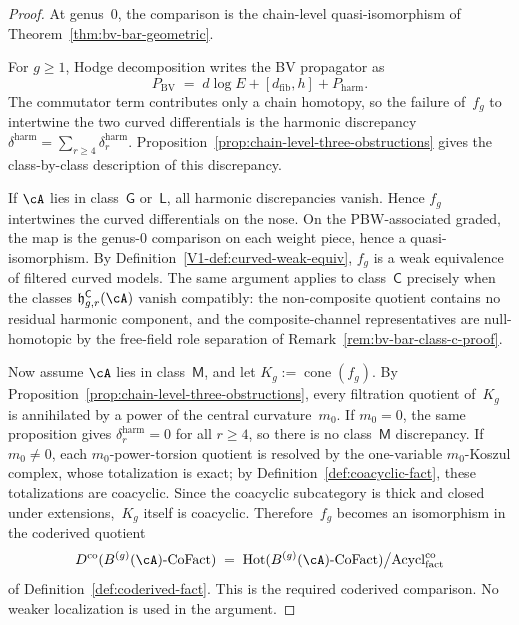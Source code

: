 \begin{proof}
At genus~$0$, the comparison is the chain-level quasi-isomorphism
of Theorem~\ref{thm:bv-bar-geometric}.

For $g \geq 1$, Hodge decomposition writes the BV propagator as
\[
P_{\mathrm{BV}}
\;=\;
d\log E + [d_{\mathrm{fib}}, h] + P_{\mathrm{harm}}.
\]
The commutator term contributes only a chain homotopy, so the
failure of~$f_g$ to intertwine the two curved differentials is the
harmonic discrepancy
$\delta^{\mathrm{harm}} = \sum_{r \geq 4}\delta_r^{\mathrm{harm}}$.
Proposition~\ref{prop:chain-level-three-obstructions} gives the
class-by-class description of this discrepancy.

If $\cA$ lies in class~$\mathsf{G}$ or~$\mathsf{L}$, all harmonic
discrepancies vanish. Hence $f_g$ intertwines the curved
differentials on the nose. On the PBW-associated graded, the map is
the genus-$0$ comparison on each weight piece, hence a
quasi-isomorphism. By Definition~\ref{V1-def:curved-weak-equiv}, $f_g$
is a weak equivalence of filtered curved models. The same argument
applies to class~$\mathsf{C}$ precisely when the classes
\(\mathfrak h_{g,r}^{\mathsf C}(\cA)\) vanish compatibly: the
non-composite quotient contains no residual harmonic component, and the
composite-channel representatives are null-homotopic by the free-field
role separation of Remark~\ref{rem:bv-bar-class-c-proof}.

Now assume $\cA$ lies in class~$\mathsf{M}$, and let
$K_g := \operatorname{cone}(f_g)$. By
Proposition~\ref{prop:chain-level-three-obstructions}, every
filtration quotient of~$K_g$ is annihilated by a power of the
central curvature~$m_0$. If $m_0 = 0$, the same proposition gives
$\delta_r^{\mathrm{harm}} = 0$ for all $r \geq 4$, so there is no
class~$\mathsf{M}$ discrepancy. If $m_0 \neq 0$, each
$m_0$-power-torsion quotient is resolved by the one-variable
$m_0$-Koszul complex, whose totalization is exact; by
Definition~\ref{def:coacyclic-fact}, these totalizations are
coacyclic. Since the coacyclic subcategory is thick and closed
under extensions,~$K_g$ itself is coacyclic. Therefore~$f_g$
becomes an isomorphism in the coderived quotient
\[
D^{\mathrm{co}}(B^{(g)}(\cA)\text{-}\mathrm{CoFact})
\;=\;
\mathrm{Hot}(B^{(g)}(\cA)\text{-}\mathrm{CoFact})
\big/\mathrm{Acycl}^{\mathrm{co}}_{\mathrm{fact}}
\]
of Definition~\ref{def:coderived-fact}. This is the required
coderived comparison. No weaker localization is used in the argument.
\end{proof}


